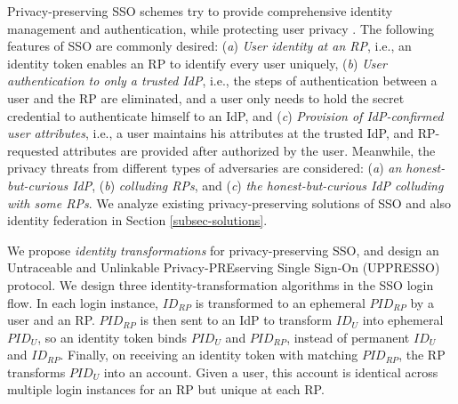 Privacy-preserving SSO schemes try to provide comprehensive identity management and authentication,
    while protecting user privacy \cite{maler2008venn,NIST2017draft,BrowserID,SPRESSO}.
The following features of SSO are commonly desired:
(\emph{a}) \emph{User identity at an RP},
    i.e., an identity token enables an RP to identify every user uniquely,
(\emph{b}) \emph{User authentication to only a trusted IdP}, i.e.,
    the steps of authentication between a user and the RP are eliminated,
    and a user only needs to hold the secret credential to authenticate himself to an IdP,
and (\emph{c}) \emph{Provision of IdP-confirmed user attributes},
    i.e., a user maintains his attributes at the trusted IdP,
    and RP-requested attributes are provided %
            after authorized by the user.
Meanwhile,
    the privacy threats from different types of adversaries are considered:
    (\emph{a}) \emph{an honest-but-curious IdP},
    (\emph{b}) \emph{colluding RPs},
    and (\emph{c}) \emph{the honest-but-curious IdP colluding with some RPs}.
We analyze existing privacy-preserving solutions of SSO and also identity federation
in Section \ref{subsec-solutions}.


We propose {\em identity transformations} for privacy-preserving SSO,
and design an Untraceable and Unlinkable Privacy-PREserving Single Sign-On (UPPRESSO) protocol.
We design three identity-transformation algorithms in the SSO login flow.
In each login instance,
        $ID_{RP}$ is transformed to an ephemeral $PID_{RP}$  by a user and an RP.
$PID_{RP}$ is then sent to an IdP to transform $ID_U$ into ephemeral $PID_U$,
    so an identity token binds $PID_U$ and $PID_{RP}$, instead of permanent $ID_U$ and $ID_{RP}$.
Finally,
    on receiving an identity token with matching $PID_{RP}$,
        the RP transforms $PID_U$ into an account.
Given a user, this account is identical across multiple login instances for an RP
     but unique at each RP.


